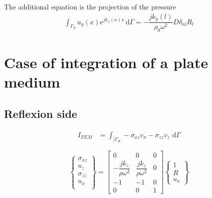 \documentclass[11pt,A4paper]{book}
\newcommand{\ds}{\displaystyle}
\renewcommand{\d}{\,\textrm{d}}
\renewcommand{\:}{\tb{:}}
\begin{document}
The additional equation is the projection of the pressure
\begin{align}
\ds{\int_{\Gamma_T}}u_y(x) e^{jk_x(n)x}\d\Gamma=
-
\dfrac{jk_y(l)}{\rho_0\omega^2}
{D\delta_{nl}}R_l
\end{align}


\section{Case of integration of a plate medium}

\subsection{Reflexion side}

\begin{align}
I_{FEM}&=\ds{\int_{|\Gamma_R}} - \sigma_{xz}v_x-\sigma_{zz}v_z \,\d\Gamma
\end{align}

\begin{equation}
\left\{
\begin{array}{c}
\sigma_{xz}\\
u_z\\
\sigma_{zz}\\
u_x\\
\end{array}
\right\}=\left[
\begin{array}{ccc}
0 &0 &0\\
{-\dfrac{jk_z}{\rho\omega^2}}
&{\dfrac{jk_z}{\rho\omega^2}}&0\\
-1&-1&0\\
0&0&1
\end{array}
\right]\left\{
\begin{array}{c}
1\\
R\\
u_x
\end{array}
\right\}
\end{equation}
\end{document}

